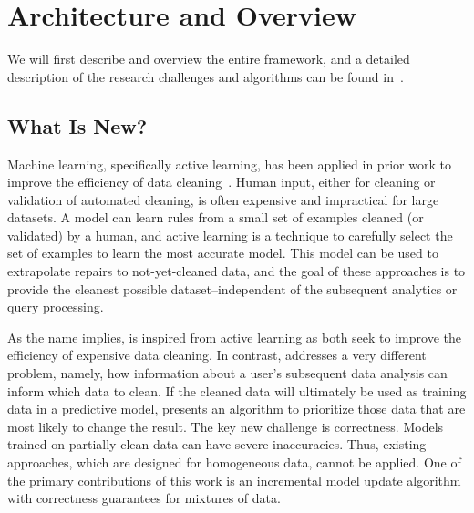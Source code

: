 \section{Architecture and Overview}\label{arch}
We will first describe \sys and overview the entire framework, and a detailed description of the research challenges and algorithms can be found in~\cite{activecleanarxiv}.

\subsection{What Is New?}
Machine learning, specifically active learning, has been applied in prior work to improve the efficiency of data cleaning~\cite{yakout2013don,DBLP:journals/pvldb/YakoutENOI11,gokhale2014corleone}.
Human input, either for cleaning or validation of automated cleaning, is often expensive and impractical for large datasets.
A model can learn rules from a small set of examples cleaned (or validated) by a human, and active learning is a technique to carefully select the set of examples to learn the most accurate model.
This model can be used to extrapolate repairs to not-yet-cleaned data, and the goal of these approaches is to provide the cleanest possible dataset--independent of the subsequent analytics or query processing.

As the name implies, \sys is inspired from active learning as both seek to improve the efficiency of expensive data cleaning.
In contrast, \sys addresses a very different problem, namely, how information about a user's subsequent data analysis can inform which data to clean.
If the cleaned data will ultimately be used as training data in a predictive model, \sys presents an algorithm to prioritize those data that are most likely to change the result.
The key new challenge is correctness.
Models trained on partially clean data can have severe inaccuracies.
Thus, existing approaches, which are designed for homogeneous data, cannot be applied.
One of the primary contributions of this work is an incremental model update algorithm with correctness guarantees for mixtures of data.

